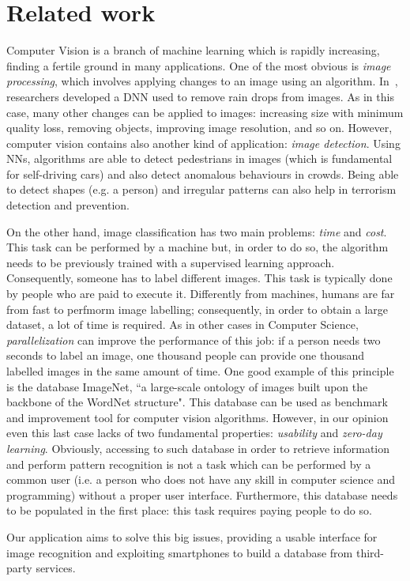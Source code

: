 \section{Related work}
\label{sec:related}

Computer Vision is a branch of machine learning which is rapidly increasing, 
finding a fertile ground in many applications. One of the most obvious is 
\textit{image processing}, which involves applying changes to an image using an 
algorithm. In~\cite{Rain}, researchers developed a DNN used to remove rain drops 
from images. As in this case, many other changes can be applied to images: 
increasing size with minimum quality loss, removing objects, improving image 
resolution, and so on. However, computer vision contains also another kind of 
application: \textit{image detection}. Using NNs, algorithms are able to detect 
pedestrians in images\cite{Pedestrian} (which is fundamental for self-driving 
cars) and also detect anomalous behaviours in crowds\cite{Crowd}. Being able to 
detect shapes (e.g. a person) and irregular patterns can also help in terrorism 
detection and prevention.

On the other hand, image classification has two main problems: \textit{time} and 
\textit{cost}. This task can be performed by a machine but, in order to do so, 
the algorithm needs to be previously trained with a supervised learning 
approach. Consequently, someone has to label different images. This task is typically 
done by people who are paid to execute it. Differently from machines, humans are 
far from fast to perfmorm image labelling; consequently, in order to obtain a large 
dataset, a lot of time is required.
As in other cases in Computer Science, \textit{parallelization} can improve the 
performance of this job: if a person needs two seconds to label an image, one 
thousand people can provide one thousand labelled images in the same amount of 
time. One good example of this principle is the database 
ImageNet\cite{ImageNet2}, ``a large-scale ontology of images built upon the 
backbone of the WordNet structure"\cite{ImageNet1}. This database can be used as 
benchmark and improvement tool for computer vision algorithms.
However, in our opinion even this last case lacks of two fundamental 
properties: \textit{usability} and \textit{zero-day learning}. Obviously, 
accessing to such database in order to retrieve information and perform pattern 
recognition is not a task which can be performed by a common user (i.e. a person 
who does not have any skill in computer science and programming) without a proper user 
interface. Furthermore, this database needs to be populated in the first place: 
this task requires paying people to do so.

Our application aims to solve this big issues, providing a usable interface for 
image recognition and exploiting smartphones to build a database from third-party 
services.
